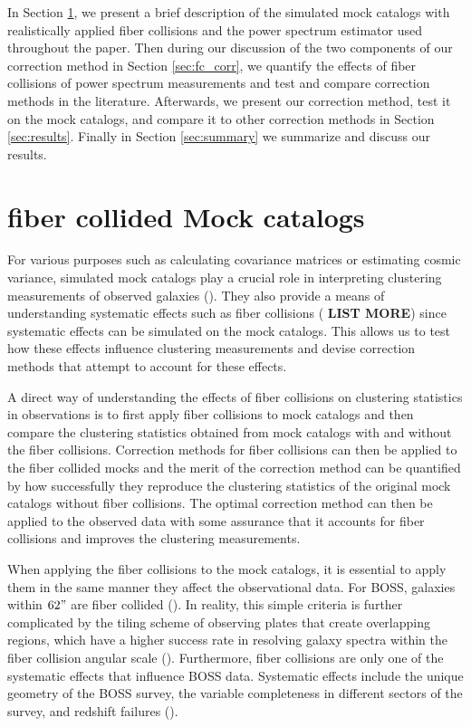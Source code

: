 \documentclass{emulateapj}
\begin{document}
In Section \ref{sec:catalog}, we present a brief description of the simulated mock catalogs with realistically applied fiber collisions and the power spectrum estimator used throughout the paper. Then during our discussion of the two components of our correction method in Section \ref{sec:fc_corr}, we quantify the effects of fiber collisions of power spectrum measurements and test and compare correction methods in the literature. Afterwards, we present our correction method, test it on the mock catalogs, and compare it to other correction methods in Section \ref{sec:results}. Finally in Section \ref{sec:summary} we summarize and discuss our results. 

\section{fiber collided Mock catalogs} \label{sec:catalog}
For various purposes such as calculating covariance matrices or estimating cosmic variance, simulated mock catalogs play a crucial role in interpreting clustering measurements of observed galaxies (\citealt{Scoccimarro:2002aa, Anderson:2012aa, Manera:2013aa}). They also provide a means of understanding systematic effects such as fiber collisions (\citealt{Guo:2012aa, Manera:2013aa} {\bf LIST MORE}) since systematic effects can be simulated on the mock catalogs. This allows us to test how these effects influence clustering measurements and devise correction methods that attempt to account for these effects.

A direct way of understanding the effects of fiber collisions on clustering statistics in observations is to first apply fiber collisions to mock catalogs and then compare the clustering statistics obtained from mock catalogs with and without the fiber collisions. Correction methods for fiber collisions can then be applied to the fiber collided mocks and the merit of the correction method can be quantified by how successfully they reproduce the clustering statistics of the original mock catalogs without fiber collisions. The optimal correction method can then be applied to the observed data with some assurance that it accounts for fiber collisions and improves the clustering measurements. 

When applying the fiber collisions to the mock catalogs, it is essential to apply them in the same manner they affect the observational data. For BOSS, galaxies within $62"$ are fiber collided (\citealt{Anderson:2012aa}). In reality, this simple criteria is further complicated by the tiling scheme of observing plates that create overlapping regions, which have a higher success rate in resolving galaxy spectra within the fiber collision angular scale (\citealt{Guo:2012aa}). Furthermore, fiber collisions are only one of the systematic effects that influence BOSS data. Systematic effects include the unique geometry of the BOSS survey, the variable completeness in different sectors of the survey, and redshift failures (\citealt{Anderson:2012aa}). 
\end{document}
